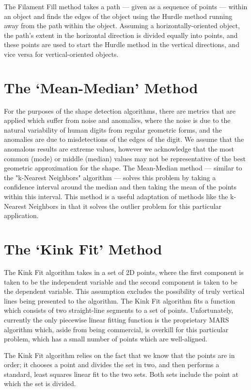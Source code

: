 The Filament Fill method takes a path --- given as a sequence of points --- within an object and finds the edges of the object using the Hurdle method running away from the path within the object. Assuming a horizontally-oriented object, the path's extent in the horizontal direction is divided equally into points, and these points are used to start the Hurdle method in the vertical directions, and vice versa for vertical-oriented objects.


\section{The `Mean-Median' Method}\label{sec:MeanMedian}
For the purposes of the shape detection algorithms, there are metrics that are applied which suffer from noise and anomalies, where the noise is due to the natural variability of human digits from regular geometric forms, and the anomalies are due to misdetections of the edges of the digit. We assume that the anomalous results are extreme values, however we acknowledge that the most common (mode) or middle (median) values may not be representative of the best geometric approximation for the shape. The Mean-Median method --- similar to the "k-Nearest Neighbors" algorithm --- solves this problem by taking a confidence interval around the median and then taking the mean of the points within this interval. This method is a useful adaptation of methods like the k-Nearest Neighbors in that it solves the outlier problem for this particular application.

\section{The `Kink Fit' Method}\label{sec:KinkFitMethod}
The Kink Fit algorithm takes in a set of 2D points, where the first component is taken to be the independent variable and the second component is taken to be the dependent variable. This assumption excludes the possibility of truly vertical lines being presented to the algorithm. The Kink Fit algorithm fits a function which consists of two straight-line segments to a set of points. Unfortunately, currently the only piecewise linear fitting function is the proprietary MARS algorithm which, aside from being commercial, is overkill for this particular problem, which has a small number of points which are well-aligned. 

The Kink Fit algorithm relies on the fact that we know that the points are in order; it chooses a point and divides the set in two, and then performs a standard, least squares linear fit to the two sets. Both sets include the point at which the set is divided. 

